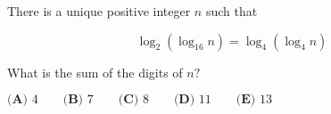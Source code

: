 There is a unique positive integer $n$ such that

$$\log_2{(\log_{16}{n})} = \log_4{(\log_4{n})}$$

What is the sum of the digits of $n?$

$\textbf{(A) } 4 \qquad \textbf{(B) } 7 \qquad \textbf{(C) } 8 \qquad \textbf{(D) } 11 \qquad \textbf{(E) } 13$